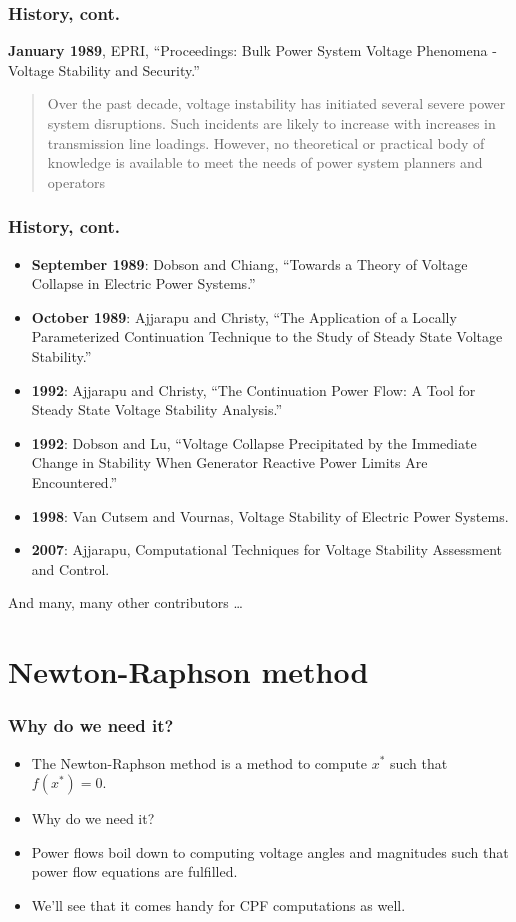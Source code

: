 \documentclass{beamer}
\begin{document}
\begin{frame}
  \frametitle{History, cont.}
\textbf{January 1989}, EPRI, “Proceedings: Bulk Power System Voltage Phenomena - Voltage Stability and Security.”
  \begin{quote}
    Over the past decade, voltage instability has initiated several severe power system disruptions. Such incidents are likely to increase with increases in transmission line loadings. However, no theoretical or practical body of knowledge is available to meet the needs of power system planners and operators
  \end{quote}
\end{frame}


\begin{frame}
  \frametitle{History, cont.}
  \begin{itemize}
  \item \textbf{September 1989}: Dobson and Chiang, “Towards a Theory of Voltage Collapse in Electric Power Systems.”
  \item \textbf{October 1989}: Ajjarapu and Christy, “The Application of a Locally Parameterized Continuation Technique to the Study of Steady State Voltage Stability.”
  \item \textbf{1992}: Ajjarapu and Christy, “The Continuation Power Flow: A Tool for Steady State Voltage Stability Analysis.”
  \item \textbf{1992}: Dobson and Lu, “Voltage Collapse Precipitated by the Immediate Change in Stability When Generator Reactive Power Limits Are Encountered.”
  \item \textbf{1998}: Van Cutsem and Vournas, Voltage Stability of Electric Power Systems.
  \item \textbf{2007}: Ajjarapu, Computational Techniques for Voltage Stability Assessment and Control.
  \end{itemize}
And many, many other contributors \ldots
\end{frame}

\section[NR method]{Newton-Raphson method}
\label{sec:newt-raphs-meth}

\begin{frame}
  \frametitle{Why do we need it?}
  \begin{itemize}
  \item The Newton-Raphson method is a method to compute $x^{*}$ such that $f(x^{*})=0$.
  \item Why do we need it?
  \item<visible@2-> Power flows boil down to computing voltage angles and magnitudes such that power flow equations are fulfilled.
  \item<visible@3-> We'll see that it comes handy for CPF computations as well.
  \end{itemize}
\end{frame}
\end{document}
